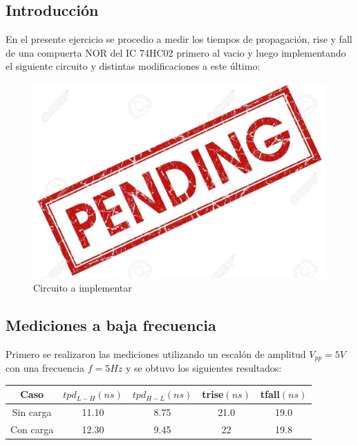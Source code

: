 
 

\subsection{Introducción}

En el presente ejercicio se procedio a medir los tiempos de propagación, rise y fall de una compuerta NOR del IC 74HC02 primero al vacio y luego implementando el siguiente circuito y distintas modificaciones a este último:

\begin{figure}[h]
    \centering
    \includegraphics{ImagenesEjercicio4/pend.jpg}
    \caption{Circuito a implementar}
\end{figure}

\subsection{Mediciones a baja frecuencia}

Primero se realizaron las mediciones utilizando un escalón de amplitud $V_{pp}=5V$ con una frecuencia $f=5 Hz$ y se obtuvo los siguientes resultados:

\begin{table}[H]
\centering
\begin{tabular}{|c|c|c|c|c|}
\hline
Caso & $tpd_{L-H}(ns)$ & $tpd_{H-L}(ns)$ & trise$(ns)$ & tfall$(ns)$ \\ \hline
Sin carga & 11.10 & 8.75 & 21.0 & 19.0 \\ \hline
Con carga & 12.30 & 9.45 & 22 & 19.8 \\ \hline
\end{tabular}
\end{table}

